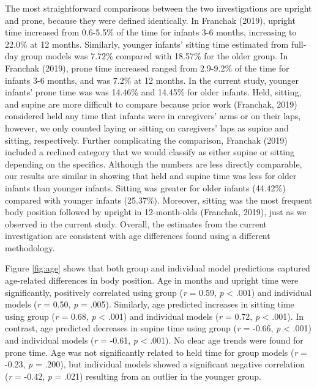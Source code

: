 \documentclass[
  man]{apa6}
\begin{document}
The most straightforward comparisons between the two investigations are upright and prone, because they were defined identically. In Franchak (2019), upright time increased from 0.6-5.5\% of the time for infants 3-6 months, increasing to 22.0\% at 12 months. Similarly, younger infants' sitting time estimated from full-day group models was 7.72\% compared with 18.57\% for the older group. In Franchak (2019), prone time increased ranged from 2.9-9.2\% of the time for infants 3-6 months, and was 7.2\% at 12 months. In the current study, younger infants' prone time was was 14.46\% and 14.45\% for older infants. Held, sitting, and supine are more difficult to compare because prior work (Franchak, 2019) considered held any time that infants were in caregivers' arms or on their laps, however, we only counted laying or sitting on caregivers' laps as supine and sitting, respectively. Further complicating the comparison, Franchak (2019) included a reclined category that we would classify as either supine or sitting depending on the specifics. Although the numbers are less directly comparable, our results are similar in showing that held and supine time was less for older infants than younger infants. Sitting was greater for older infants (44.42\%) compared with younger infants (25.37\%). Moreover, sitting was the most frequent body position followed by upright in 12-month-olds (Franchak, 2019), just as we observed in the current study. Overall, the estimates from the current investigation are consistent with age differences found using a different methodology.

Figure \ref{fig:age} shows that both group and individual model predictions captured age-related differences in body position. Age in months and upright time were significantly, positively correlated using group (\emph{r} = 0.59, \emph{p} \textless{} .001) and individual models (\emph{r} = 0.50, \emph{p} = .005). Similarly, age predicted increases in sitting time using group (\emph{r} = 0.68, \emph{p} \textless{} .001) and individual models (\emph{r} = 0.72, \emph{p} \textless{} .001). In contrast, age predicted decreases in supine time using group (\emph{r} = -0.66, \emph{p} \textless{} .001) and individual models (\emph{r} = -0.61, \emph{p} \textless{} .001). No clear age trends were found for prone time. Age was not significantly related to held time for group models (\emph{r} = -0.23, \emph{p} = .200), but individual models showed a significant negative correlation (\emph{r} = -0.42, \emph{p} = .021) resulting from an outlier in the younger group.
\end{document}
